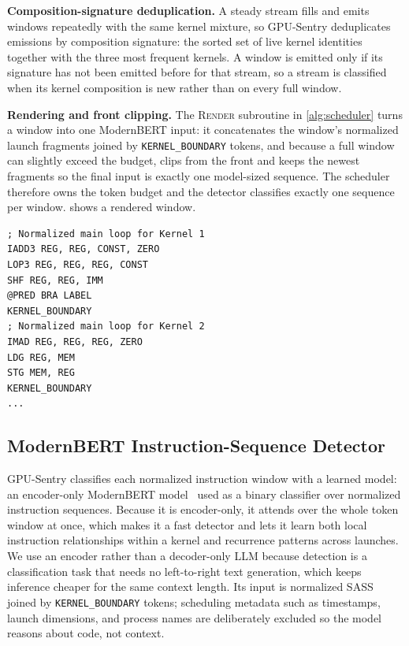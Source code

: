 \textbf{Composition-signature deduplication.}
A steady stream fills and emits windows repeatedly with the same kernel mixture, so GPU-Sentry deduplicates emissions by composition signature: the sorted set of live kernel identities together with the three most frequent kernels. A window is emitted only if its signature has not been emitted before for that stream, so a stream is classified when its kernel composition is new rather than on every full window.

\textbf{Rendering and front clipping.}
The \textsc{Render} subroutine in \cref{alg:scheduler} turns a window into one ModernBERT input: it concatenates the window's normalized launch fragments joined by \texttt{KERNEL\_BOUNDARY} tokens, and because a full window can slightly exceed the budget, clips from the front and keeps the newest fragments so the final input is exactly one model-sized sequence. The scheduler therefore owns the token budget and the detector classifies exactly one sequence per window.  shows a rendered window.

\begin{lstlisting}[caption={A rendered window concatenates per-launch normalized SASS fragments, separated by \texttt{KERNEL\_BOUNDARY} tokens, into one model-sized sequence.},label={lst:window}]
; Normalized main loop for Kernel 1
IADD3 REG, REG, CONST, ZERO
LOP3 REG, REG, REG, CONST
SHF REG, REG, IMM
@PRED BRA LABEL
KERNEL_BOUNDARY
; Normalized main loop for Kernel 2
IMAD REG, REG, REG, ZERO
LDG REG, MEM
STG MEM, REG
KERNEL_BOUNDARY
...
\end{lstlisting}

\subsection{ModernBERT Instruction-Sequence Detector}
\label{sec:classifier}

GPU-Sentry classifies each normalized instruction window with a learned model: an encoder-only ModernBERT model~\cite{warner2024modernbert} used as a binary classifier over normalized instruction sequences. Because it is encoder-only, it attends over the whole token window at once, which makes it a fast detector and lets it learn both local instruction relationships within a kernel and recurrence patterns across launches. We use an encoder rather than a decoder-only LLM because detection is a classification task that needs no left-to-right text generation, which keeps inference cheaper for the same context length. Its input is normalized SASS joined by \texttt{KERNEL\_BOUNDARY} tokens; scheduling metadata such as timestamps, launch dimensions, and process names are deliberately excluded so the model reasons about code, not context.

